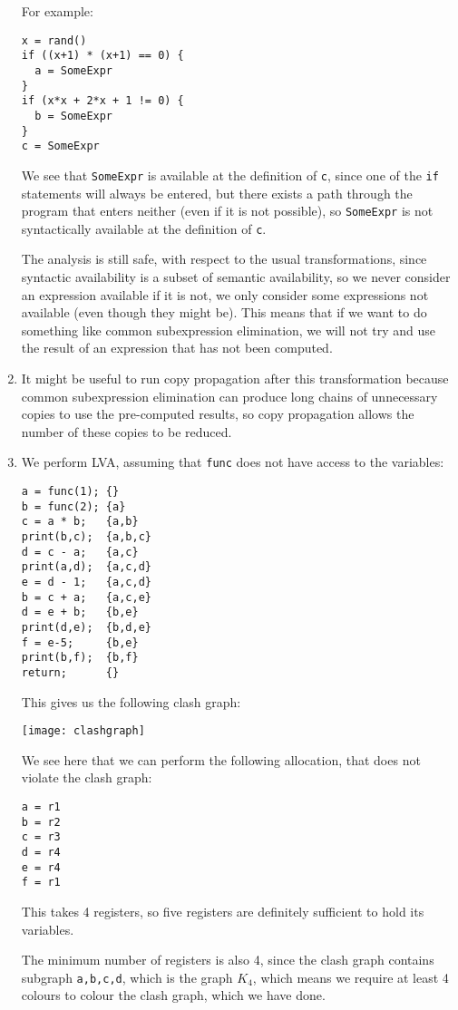 \begin{enumerate}[label=(\alph*)]
    For example:

\begin{verbatim}
x = rand()
if ((x+1) * (x+1) == 0) {
  a = SomeExpr
}
if (x*x + 2*x + 1 != 0) {
  b = SomeExpr
}
c = SomeExpr
\end{verbatim}

We see that \texttt{SomeExpr} is available at the definition of \texttt{c}, since one of the \texttt{if} statements will always be entered, but there exists a path through the program that enters neither (even if it is not possible), so \texttt{SomeExpr} is not syntactically available at the definition of \texttt{c}.

The analysis is still safe, with respect to the usual transformations, since syntactic availability is a subset of semantic availability, so we never consider an expression available if it is not, we only consider some expressions not available (even though they might be). This means that if we want to do something like common subexpression elimination, we will not try and use the result of an expression that has not been computed.

\item
  It might be useful to run copy propagation after this transformation because common subexpression elimination can produce long chains of unnecessary copies to use the pre-computed results, so copy propagation allows the number of these copies to be reduced.

\item
  We perform LVA, assuming that \texttt{func} does not have access to the variables:

\begin{verbatim}
a = func(1); {}
b = func(2); {a}
c = a * b;   {a,b}
print(b,c);  {a,b,c}
d = c - a;   {a,c}
print(a,d);  {a,c,d}
e = d - 1;   {a,c,d}
b = c + a;   {a,c,e}
d = e + b;   {b,e}
print(d,e);  {b,d,e}
f = e-5;     {b,e}
print(b,f);  {b,f}
return;      {}
\end{verbatim}

This gives us the following clash graph:

\texttt{[image: clashgraph]}

We see here that we can perform the following allocation, that does not violate the clash graph:

\begin{verbatim}
a = r1
b = r2
c = r3
d = r4
e = r4
f = r1
\end{verbatim}

This takes 4 registers, so five registers are definitely sufficient to hold its variables.

The minimum number of registers is also 4, since the clash graph contains subgraph \texttt{a,b,c,d}, which is the graph $K_4$, which means we require at least 4 colours to colour the clash graph, which we have done.






        
\end{enumerate}

